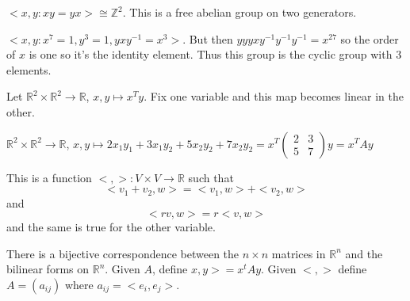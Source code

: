 \documentclass{article}
\newcommand{\R}{\mathbb{R}}
\newcommand{\Z}{\mathbb{Z}}
\newcommand{\ra}[1][]{\xrightarrow{#1}}
\begin{document}
\begin{example}
$<x,y:xy=yx>\cong \Z^2$. This is a free abelian group on two generators.
\end{example}
\begin{example}
$<x,y:x^7=1,y^3=1,yxy^{-1}=x^3>$. But then $yyyxy^{-1}y^{-1}y^{-1}=x^{27}$ so the order of $x$ is one so it's the identity element. Thus this group is the cyclic group with 3 elements.
\end{example}
\begin{example}
Let $\R^2\times\R^2\ra \R$, $x,y\mapsto x^{T}y$. Fix one variable and this map becomes linear in the other.
\end{example}
\begin{example}
$\R^2\times\R^2\ra \R$, $x,y\mapsto 2x_1y_1+3x_1y_2+5x_2y_2+7x_2y_2=x^T\begin{pmatrix}
2&3\\5&7
\end{pmatrix}y=x^TAy$
\end{example}
\begin{definition}
This is a function $<,>:V\times V\ra\R$  such that $$<v_1+v_2,w>=<v_1,w>+<v_2,w>$$ and $$<rv,w>=r<v,w>$$ and the same is true for the other variable.
\end{definition}
\begin{proposition}
There is a bijective correspondence between the $n\times n$ matrices in $\R^n$ and the bilinear forms on $\R^n$. Given $A$, define $x,y>=x^tAy$. Given $<,>$ define $A=(a_{ij})$ where $a_{ij}=<e_i,e_j>$.
\end{proposition}
\end{document}
